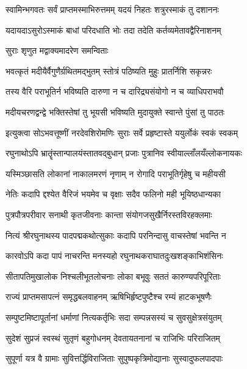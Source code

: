 
\twolineshloka
{स्वामिन्भगवतः सर्वं प्राप्तमस्माभिरुत्तमम्}
{यदयं निहतः शत्रुरस्माकं तु दशाननः}%

\twolineshloka
{यदायदाऽसुरोऽस्माकं बाधां परिदधाति भोः}
{तदा तदेति कर्तव्यमेतावद्वैरिनाशनम्}%



\onelineshloka
{सुराः शृणुत मद्वाक्यमादरेण समन्विताः}%

\twolineshloka
{भवत्कृतं मदीयैर्वैगुणैर्ग्रथितमद्भुतम्}
{स्तोत्रं पठिष्यति मुहुः प्रातर्निशि सकृन्नरः}%

\twolineshloka
{तस्य वैरि पराभूतिर्न भविष्यति दारुणा}
{न च दारिद्र्यसंयोगो न च व्याधिपराभवौ}%

\twolineshloka
{मदीयचरणद्वन्द्वे भक्तिस्तेषां तु भूयसी}
{भविष्यति मुदायुक्ते स्वान्ते पुंसां तु पाठतः}%

\twolineshloka
{इत्युक्त्वा सोऽभवत्तूष्णीं नरदेवशिरोमणिः}
{सुराः सर्वे प्रहृष्टास्ते ययुर्लोकं स्वकं स्वकम्}%

\twolineshloka
{रघुनाथोऽपि भ्रातॄंस्तान्पालयंस्तातवद्बुधान्}
{प्रजाः पुत्रानिव स्वीयाल्लाँलयँल्लोकनायकः}%

\twolineshloka
{यस्मिञ्छासति लोकानां नाकालमरणं नृणाम्}
{न रोगादि पराभूतिर्गृहेषु च महीयसी}%

\twolineshloka
{नेतिः कदापि द्दश्येत वैरिजं भयमेव च}
{वृक्षाः सदैव फलिनो मही भूयिष्ठधान्यका}%

\twolineshloka
{पुत्रपौत्रपरीवार सनाथी कृतजीवनाः}
{कान्ता संयोगजसुखैर्निरस्तविरहक्लमाः}%

\twolineshloka
{नित्यं श्रीरघुनाथस्य पादपद्मकथोत्सुकाः}
{कदापि परनिन्दासु वाचस्तेषां भवन्ति न}%

\twolineshloka
{कारवोऽपि कदा पापं नाचरन्ति मनस्यहो}
{रघुनाथकराघातदुःखशङ्काभिशंसिनः}%

\twolineshloka
{सीतापतिमुखालोक निश्चलीभूतलोचनाः}
{लोका बभूवुः सततं कारुण्यपरिपूरिताः}%

\twolineshloka
{राज्यं प्राप्तमसापत्नं समृद्धबलवाहनम्}
{ऋषिभिर्हृष्टपुष्टैश्च रम्यं हाटकभूषणैः}%

\twolineshloka
{सम्पुष्टमिष्टापूर्तानां धर्माणां नित्यकर्तृभिः}
{सदा सम्पन्नसस्यं च सुवसुक्षेत्रसंयुतम्}%

\twolineshloka
{सुदेशं सुप्रजं स्वस्थं सुतृणं बहुगोधनम्}
{देवतायतनानां च राजिभिः परिराजितम्}%

\twolineshloka
{सुपूर्णा यत्र वै ग्रामाः सुवित्तर्द्धिविराजिताः}
{सुपुष्पकृत्रिमोद्यानाः सुस्वादुफलपादपाः}%

